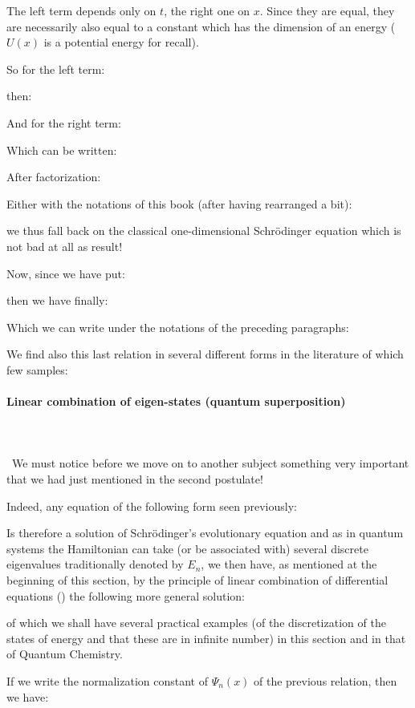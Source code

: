 	The left term depends only on $t$, the right one on $x$. Since they are equal, they are necessarily also equal to a constant which has the dimension of an energy ($U(x)$ is a potential energy for recall).

	So for the left term:
	
	then:
	
	And for the right term:
	
	Which can be written:
	
	After factorization:
	
	Either with the notations of this book (after having rearranged a bit):
	
	we thus fall back on the classical one-dimensional Schrödinger  equation which is not bad at all as result!

	Now, since we have put:
	
		then we have finally:
	
	Which we can write under the notations of the preceding paragraphs:
	
	We find also this last relation in several different forms in the literature of which few samples:
	
	
	\paragraph{Linear combination of eigen-states (quantum superposition)}\label{quantum superposition}\mbox{}\\\\\
	We must notice before we move on to another subject something very important that we had just mentioned in the second postulate!

	Indeed, any equation of the following form seen previously:
	
	Is therefore a solution of Schrödinger's evolutionary equation and as in quantum systems the Hamiltonian can take (or be associated with) several discrete eigenvalues traditionally denoted by $E_n$, we then have, as mentioned at the beginning of this section, by the principle of linear combination of differential equations () the following more general solution:
	
	of which we shall have several practical examples (of the discretization of the states of energy and that these are in infinite number) in this section and in that of Quantum Chemistry.

	If we write the normalization constant of $\Psi_n(x)$ of the previous relation, then we have:
	
